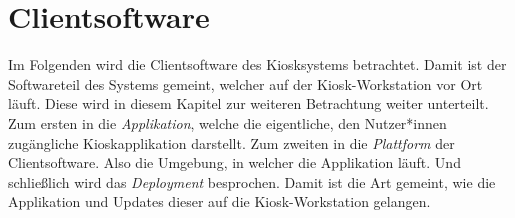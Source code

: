 \section{Clientsoftware}
\label{sec:frontend}

\iffalse
- viele Anforderungen
- Fokus der Thesis
- beschreibt alle Schritte um eine Webandwendung in eine gelunge Kioskapplikation zu bringen
- Was meint Frontend: die eigentliche Kioskapplikation, Plattform: die Umgebung der Applikation, Deployment der Applikation
- SPA Routing im Frontend
- rein mit Webtechnologien, und noch weiter rein mit Browsertechnologien: beschränken auf HTML, CSS und JS
- mit Electron bindet man sich an die Plattform
\fi

Im Folgenden wird die Clientsoftware des Kiosksystems betrachtet. Damit ist der 
Softwareteil des Systems gemeint, welcher auf der Kiosk-Workstation vor 
Ort läuft. Diese wird in diesem Kapitel zur weiteren Betrachtung 
weiter unterteilt. Zum ersten in die \emph{Applikation}, 
welche die eigentliche, den Nutzer*innen zugängliche Kioskapplikation darstellt.
Zum zweiten in die \emph{Plattform} der Clientsoftware.
Also die Umgebung, in welcher die Applikation läuft.
Und schließlich wird das \emph{Deployment} besprochen. Damit ist die Art gemeint,
wie die Applikation und Updates dieser auf die Kiosk-Workstation gelangen.\\




